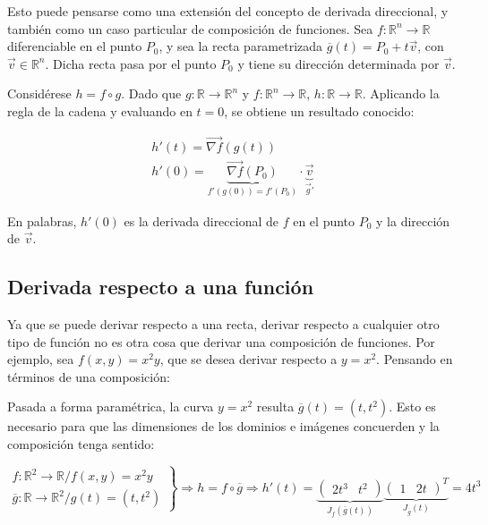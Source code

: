 \documentclass{article}
\renewcommand{\Bbb}{\mathbb}
\begin{document}
Esto puede pensarse como una extensión del concepto de derivada direccional, y también como un caso particular de composición de funciones. Sea $f:\Bbb R^n \rightarrow \Bbb R$ diferenciable en el punto $P_0$, y sea la recta parametrizada $\overline{g}(t) = P_0 + t \overrightarrow{v}$, con $\overrightarrow{v} \in \Bbb R^n$. Dicha recta pasa por el punto $P_0$ y tiene su dirección determinada por $\overrightarrow{v}$.

Considérese $h = f \circ g$. Dado que $g:\Bbb R \rightarrow \Bbb R^n$ y $f:\Bbb R^n \rightarrow \Bbb R$, $h:\Bbb R \rightarrow \Bbb R$. Aplicando la regla de la cadena y evaluando en $t=0$, se obtiene un resultado conocido:

\begin{gather}
h'(t) = \overrightarrow{\nabla{f}}(g(t))  \\
h'(0) = \underbrace{ \overrightarrow{\nabla{f}}(P_0) }_{f'(g(0)) = f'(P_0)} \cdot \underbrace{ \overrightarrow{v} }_{ \overrightarrow{g}' }
\end{gather}

En palabras, $h'(0)$ es la derivada direccional de $f$ en el punto $P_0$ y la dirección de $\overrightarrow{v}$.

\subsection{Derivada respecto a una función}

Ya que se puede derivar respecto a una recta, derivar respecto a cualquier otro tipo de función no es otra cosa que derivar una composición de funciones. Por ejemplo, sea $f(x,y) = x^2 y$, que se desea derivar respecto a $y = x^2$. Pensando en términos de una composición:

Pasada a forma paramétrica, la curva $y = x^2$ resulta $\overline{g}(t) = (t, t^2)$. Esto es necesario para que las dimensiones de los dominios e imágenes concuerden y la composición tenga sentido:

\begin{equation}
\left.
\begin{array}{ll}
f:\Bbb R^2 \rightarrow \Bbb R / f(x,y) = x^2 y \\
\overline{g}: \Bbb R \rightarrow \Bbb R^2 / g(t) = (t, t^2)
\end{array}
\right\} \Rightarrow h = f \circ \overline{g} \Rightarrow h'(t) = \underbrace{ \left( \begin{matrix}2t^3 & t^2\end{matrix} \right) }_{J_f(\overline{g}(t))} \underbrace{ \left( \begin{matrix}1 & 2t\end{matrix} \right)^T }_{J_{\overline{g}}(t)} = 4t^3
\end{equation}
\end{document}
